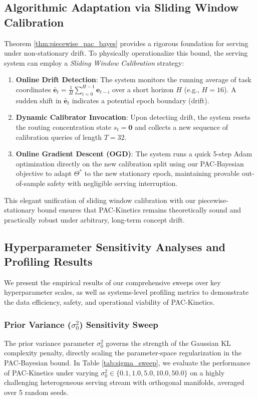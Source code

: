 \subsection{Algorithmic Adaptation via Sliding Window Calibration}
Theorem \ref{thm:piecewise_pac_bayes} provides a rigorous foundation for serving under non-stationary drift. To physically operationalize this bound, the serving system can employ a \emph{Sliding Window Calibration} strategy:
\begin{enumerate}
    \item \textbf{Online Drift Detection}: The system monitors the running average of task coordinates $\bar{\mathbf{e}}_t = \frac{1}{H}\sum_{i=0}^{H-1} \mathbf{e}_{t-i}$ over a short horizon $H$ (e.g., $H=16$). A sudden shift in $\bar{\mathbf{e}}_t$ indicates a potential epoch boundary (drift).
    \item \textbf{Dynamic Calibrator Invocation}: Upon detecting drift, the system resets the routing concentration state $s_t = \mathbf{0}$ and collects a new sequence of calibration queries of length $T = 32$.
    \item \textbf{Online Gradient Descent (OGD)}: The system runs a quick 5-step Adam optimization directly on the new calibration split using our PAC-Bayesian objective to adapt $\Theta^*$ to the new stationary epoch, maintaining provable out-of-sample safety with negligible serving interruption.
\end{enumerate}
This elegant unification of sliding window calibration with our piecewise-stationary bound ensures that PAC-Kinetics remains theoretically sound and practically robust under arbitrary, long-term concept drift.

\subsection{Hyperparameter Sensitivity Analyses and Profiling Results}
\label{sec:sensitivity_and_profiling}

We present the empirical results of our comprehensive sweeps over key hyperparameter scales, as well as systems-level profiling metrics to demonstrate the data efficiency, safety, and operational viability of PAC-Kinetics.

\subsubsection{Prior Variance ($\sigma_0^2$) Sensitivity Sweep}
The prior variance parameter $\sigma_0^2$ governs the strength of the Gaussian KL complexity penalty, directly scaling the parameter-space regularization in the PAC-Bayesian bound. In Table \ref{tab:sigma_sweep}, we evaluate the performance of PAC-Kinetics under varying $\sigma_0^2 \in \{0.1, 1.0, 5.0, 10.0, 50.0\}$ on a highly challenging heterogeneous serving stream with orthogonal manifolds, averaged over 5 random seeds.

